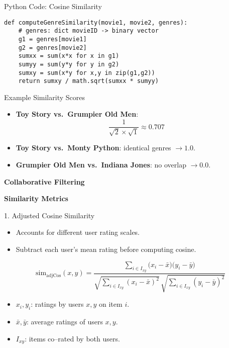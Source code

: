 \documentclass{beamer}
\begin{document}
\begin{frame}[fragile]{Python Code: Cosine Similarity}
\begin{lstlisting}
def computeGenreSimilarity(movie1, movie2, genres):
    # genres: dict movieID -> binary vector
    g1 = genres[movie1]
    g2 = genres[movie2]
    sumxx = sum(x*x for x in g1)
    sumyy = sum(y*y for y in g2)
    sumxy = sum(x*y for x,y in zip(g1,g2))
    return sumxy / math.sqrt(sumxx * sumyy)
\end{lstlisting}
\end{frame}

\begin{frame}{Example Similarity Scores}
\begin{itemize}
  \item \textbf{Toy Story vs.\ Grumpier Old Men}: 
    \[
      \frac{1}{\sqrt{2}\times\sqrt{1}} \approx 0.707
    \]
  \item \textbf{Toy Story vs.\ Monty Python}: identical genres $\to1.0$.
  \item \textbf{Grumpier Old Men vs.\ Indiana Jones}: no overlap $\to0.0$.
\end{itemize}
\end{frame}

\begin{frame}[plain]
    \begin{center}
        {\LARGE \textbf{Collaborative Filtering}}
    \end{center}
\end{frame}

\begin{frame}[plain]
    \begin{center}
        {\LARGE \textbf{Similarity Metrics}}
    \end{center}
\end{frame}

\begin{frame}{1. Adjusted Cosine Similarity}
\begin{itemize}
  \item Accounts for different user rating scales.
  \item Subtract each user's mean rating before computing cosine.
\end{itemize}
\[
\text{sim}_{\mathrm{adjCos}}(x,y)
= \frac{\sum_{i\in I_{xy}}\bigl(x_i - \bar x\bigr)\bigl(y_i - \bar y\bigr)}
       {\sqrt{\sum_{i\in I_{xy}}(x_i - \bar x)^2}\,
        \sqrt{\sum_{i\in I_{xy}}(y_i - \bar y)^2}}
\]
\begin{itemize}
  \item \(x_i,y_i\): ratings by users \(x,y\) on item \(i\).  
  \item \(\bar x,\bar y\): average ratings of users \(x,y\).
  \item \(I_{xy}\): items co–rated by both users.
\end{itemize}
\end{frame}
\end{document}
